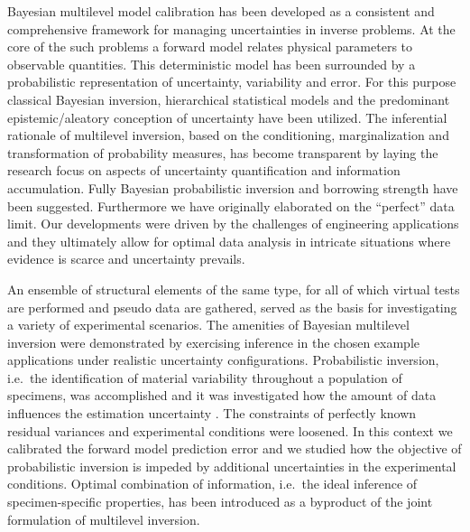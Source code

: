 Bayesian multilevel model calibration has been developed as a consistent and comprehensive framework for managing uncertainties in inverse problems.
At the core of the such problems a forward model relates physical parameters to observable quantities.
This deterministic model has been surrounded by a probabilistic representation of uncertainty, variability and error.
For this purpose classical Bayesian inversion, hierarchical statistical models and the predominant epistemic/aleatory conception of uncertainty have been utilized.
The inferential rationale of multilevel inversion, based on the conditioning, marginalization and transformation of probability measures,
has become transparent by laying the research focus on aspects of uncertainty quantification and information accumulation.
Fully Bayesian probabilistic inversion and borrowing strength have been suggested.
Furthermore we have originally elaborated on the ``perfect'' data limit.
Our developments were driven by the challenges of engineering applications and they ultimately allow for optimal data analysis in intricate situations where evidence is scarce and uncertainty prevails.
\par %
An ensemble of structural elements of the same type, for all of which virtual tests are performed and pseudo data are gathered, served as the basis for investigating a variety of experimental scenarios.
The amenities of Bayesian multilevel inversion were demonstrated by exercising inference in the chosen example applications under realistic uncertainty configurations.
Probabilistic inversion, i.e.\ the identification of material variability throughout a population of specimens, was accomplished and it was investigated how the amount of data influences the estimation uncertainty .
The constraints of perfectly known residual variances and experimental conditions were loosened.
In this context we calibrated the forward model prediction error and we studied how the objective of probabilistic inversion is impeded by additional uncertainties in the experimental conditions.
Optimal combination of information, i.e.\ the ideal inference of specimen-specific properties, has been introduced as a byproduct of the joint formulation of multilevel inversion.
